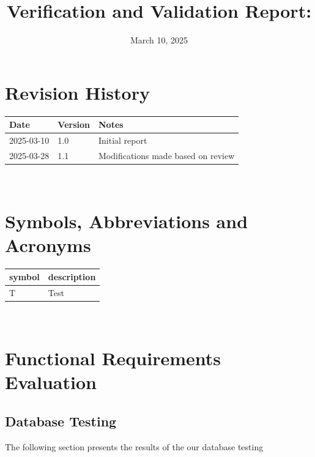 \documentclass[12pt, titlepage]{article}
\begin{document}
\title{Verification and Validation Report: \progname}
\author{\authname}
\date{March 10, 2025}

\maketitle


\section{Revision History}

\begin{tabularx}{\textwidth}{p{3cm}p{2cm}X}
  \toprule {\bf Date} & {\bf Version} & {\bf Notes} \\
  \midrule
  2025-03-10              & 1.0           & Initial report\\
  2025-03-28              & 1.1           & Modifications made based on review \\
  \bottomrule
\end{tabularx}

~\newpage

\section{Symbols, Abbreviations and Acronyms}

\renewcommand{\arraystretch}{1.2}
\begin{tabular}{l l}
  \toprule
  \textbf{symbol} & \textbf{description} \\
  \midrule
  T               & Test                 \\
  \bottomrule
\end{tabular}\\

\newpage

\tableofcontents

\listoftables %

\listoffigures %

\newpage


\section{Functional Requirements Evaluation}

\subsection{Database Testing}
The following section presents the results of the our database testing
\end{document}
